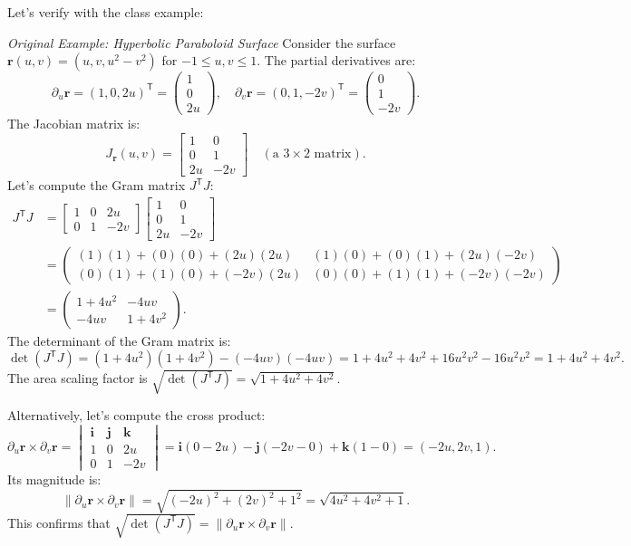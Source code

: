 \documentclass[12pt]{article}
\theoremstyle{definition} %
\theoremstyle{plain} %
\theoremstyle{remark} %
\begin{document}
Let's verify with the class example:

\textit{Original Example: Hyperbolic Paraboloid Surface}
Consider the surface $\mathbf{r}(u,v) = (u, v, u^2-v^2)$ for $-1 \leq u,v \leq 1$.
The partial derivatives are:
\[
    \partial_u \mathbf{r} = (1, 0, 2u)^{\mathsf{T}} = \begin{pmatrix} 1 \\ 0 \\ 2u \end{pmatrix}, \quad
    \partial_v \mathbf{r} = (0, 1, -2v)^{\mathsf{T}} = \begin{pmatrix} 0 \\ 1 \\ -2v \end{pmatrix}.
\]
The Jacobian matrix is:
\[
    J_{\mathbf{r}}(u,v) = \begin{bmatrix} 1 & 0 \\ 0 & 1 \\ 2u & -2v \end{bmatrix} \quad (\text{a } 3 \times 2 \text{ matrix}).
\]
Let's compute the Gram matrix $J^{\mathsf{T}}J$:
\begin{align*} J^{\mathsf{T}}J &= \begin{bmatrix} 1 & 0 & 2u \\ 0 & 1 & -2v \end{bmatrix} \begin{bmatrix} 1 & 0 \\ 0 & 1 \\ 2u & -2v \end{bmatrix} \\ &= \begin{pmatrix} (1)(1) + (0)(0) + (2u)(2u) & (1)(0) + (0)(1) + (2u)(-2v) \\ (0)(1) + (1)(0) + (-2v)(2u) & (0)(0) + (1)(1) + (-2v)(-2v) \end{pmatrix} \\ &= \begin{pmatrix} 1+4u^2 & -4uv \\ -4uv & 1+4v^2 \end{pmatrix}. \end{align*}
The determinant of the Gram matrix is:
\[
    \det(J^{\mathsf{T}}J) = (1+4u^2)(1+4v^2) - (-4uv)(-4uv) = 1 + 4u^2 + 4v^2 + 16u^2v^2 - 16u^2v^2 = 1+4u^2+4v^2.
\]
The area scaling factor is $\sqrt{\det(J^{\mathsf{T}}J)} = \sqrt{1+4u^2+4v^2}$.

Alternatively, let's compute the cross product:
\[
    \partial_u \mathbf{r} \times \partial_v \mathbf{r} =
    \begin{vmatrix} \mathbf{i} & \mathbf{j} & \mathbf{k} \\ 1 & 0 & 2u \\ 0 & 1 & -2v \end{vmatrix}
    = \mathbf{i}(0 - 2u) - \mathbf{j}(-2v - 0) + \mathbf{k}(1 - 0) = (-2u, 2v, 1).
\]
Its magnitude is:
\[
    \|\partial_u \mathbf{r} \times \partial_v \mathbf{r}\| = \sqrt{(-2u)^2 + (2v)^2 + 1^2} = \sqrt{4u^2+4v^2+1}.
\]
This confirms that $\sqrt{\det(J^{\mathsf{T}}J)} = \|\partial_u \mathbf{r} \times \partial_v \mathbf{r}\|$.
\end{document}
